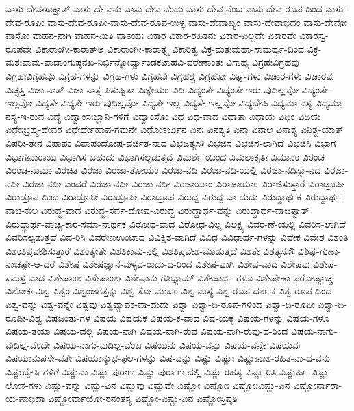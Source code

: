 {ವಾಸು-ದೇವಃಸಾಕ್ಷಾತ್
ವಾಸು-ದೇ-ವನು
ವಾಸು-ದೇವ-ನೆಂದು
ವಾಸು-ದೇವ-ನೆಂಬ
ವಾಸು-ದೇವ-ರೂಪ-ದಿಂದ
ವಾಸು-ದೇವ-ರೂಪೀ
ವಾಸು-ದೇವ-ರೂಪೀ-ವಾಸು-ದೇವ-ರೂಪ-ಉಳ್ಳ
ವಾಸು-ದೇವಾಖ್ಯಂ
ವಾಸು-ದೇವಾಭಿದಂ
ವಾಸು-ದೇವೋ
ವಾಸೋ
ವಾಹನ-ನಾಗಿ
ವಾಹನ-ಮಿತಿ
ವಾಽಯಃ
ವಿಕಾರ
ವಿಕಾರ-ರಹಿತನು
ವಿಕಾರ-ವಿಲ್ಲದೇ
ವಿಕಾರವೇ
ವಿಕಾರಸ್ವ-ರೂಪವೇ
ವಿಕಾರಾಂಗೀ-ಕಾರಾತ್ಅ
ವಿಕಾರಾಂಗೀ-ಕಾರಾತ್ನೃ
ವಿಕಾರಿತ್ವ
ವಿಕ್ರ-ಮತಃಮಹಾ-ಸಾಮರ್ಥ್ಯ-ದಿಂದ
ವಿಕ್ರ-ಮತಃವಾಮ-ಪಾದಾಂಗುಷ್ಠನಖ-ನಿರ್ಭಿನ್ನೋರ್ಧ್ವಾಂಡಕಟಾಹವಿ-ವರೇಣಾಂತಃ
ವಿಗಾಹ್ಯ
ವಿಗ್ರಹಃವಿಗ್ರಹವು
ವಿಗ್ರಹಃವಿಗ್ರಹವೂ
ವಿಗ್ರಹ-ಗಳನ್ನು
ವಿಗ್ರಹ-ಗಳು
ವಿಗ್ರಹವು
ವಿಗ್ರಹಶ್ಚ
ವಿಗ್ರಹೋ
ವಿಘ್ನ-ಗಳು
ವಿಚಾರ-ಗಳು
ವಿಚಾರವು
ವಿಚ್ಛತ್ತಿ
ವಿಜಾ-ನಾತ್
ವಿಜಾ-ನಾತ್ಸ-ಪಿತುಷ್ಟಿತಾ
ವಿಜ್ಞೇಯಂ
ವಿದಿ
ವಿದ್ಯಂತೇ
ವಿದ್ಯಂತೇ-ಇರು-ವುದಿಲ್ಲವೋ
ವಿದ್ಯಂತೇ-ಇಲ್ಲವೋ
ವಿದ್ಯತೇ
ವಿದ್ಯತೇ-ಇರು-ವುದಿಲ್ಲವೋ
ವಿದ್ಯತೇ-ಇಲ್ಲ
ವಿದ್ಯತೇ-ಇಲ್ಲವೋ
ವಿದ್ಯದೇಪಿ
ವಿದ್ಯಮಾ-ನಸ್ಯ
ವಿದ್ಯಮಾ-ನಸ್ಯ-ಇ-ರುವ
ವಿದ್ಯೆ
ವಿದ್ವಾಂಸಃಜ್ಞಾನಿ-ಗಳಿಗೆ
ವಿದ್ವಾಂಸೋ
ವಿಧ
ವಿಧ-ವಾದ
ವಿಧಾತಾ
ವಿಧಾಯ
ವಿಧಿಂ
ವಿಧಿಯ
ವಿಧೇಃಬ್ರಹ್ಮ-ದೇವರ
ವಿಧೇರ್ದೇಹಾಪ-ಗಮನೇ
ವಿಧೋಽರ್ಜುನ
ವಿನಃ
ವಿನಶ್ಯತಿ
ವಿನಾ
ವಿನಾಆ
ವಿನಾಶ್ಯ
ವಿನಿಶ್ಚ-ಯಾತ್
ವಿಪರೀ-ತೇನ
ವಿಪಾಪಂ
ವಿಪಾಪಂದೋಷ-ವರ್ಜಿತ-ನಾದ
ವಿಭಜತ್ಯಸೌ
ವಿಭಜಿಸ
ವಿಭಜಿಸ-ಲಾಗಿದೆ
ವಿಭಜಿಸಿ
ವಿಭಾಗ
ವಿಭಾಗಃನಾರಾಯ
ವಿಭಾಗಿಸ-ಬಹುದು
ವಿಭಾಗಿಸಲ್ಪಡುತ್ತದೆ
ವಿಮರ್ಶೆ-ಯಿಂದ
ವಿಮಲಾಕೃತಿಃ
ವಿಮಾನಂ
ವಿರಂಚ
ವಿರಂಚ-ನಾಮಾ
ವಿರಚಿತ
ವಿರಜಾ
ವಿರಜಾ-ತೋಯಂ
ವಿರಜಾ-ನದಿ
ವಿರಜಾ-ನದಿ-ಯಲ್ಲಿ
ವಿರಜಾ-ನದಿಸ್ನಾ-ನದ
ವಿರಜಾ-ನದೀ
ವಿರಜಾ-ನದೀ-ಎಂದರೆ
ವಿರಜಾ-ನದೀ-ವಿರಜಾ-ನದೀ
ವಿರಜಾಯಾಂ
ವಿರಾಜಾಯಾಂ
ವಿರಾಜಿಸುತ್ತಾರೆ
ವಿರಾಟ್ರೂಪೀ
ವಿರಾಡ್ರೂಪ-ದಿಂದ
ವಿರಾಡ್ರೂಪೀ
ವಿರಾಡ್ರೂಪೀ-ವಿರಾಟ್ರೂಪ
ವಿರುದ್ದ
ವಿರುದ್ದ-ವಾ-ದುದು
ವಿರುದ್ದಾರ್ಥಕ
ವಿರುದ್ದಾರ್ಥ-ವಾಚ-ಕಃಅ
ವಿರುದ್ಧ-ವಾದ
ವಿರುದ್ಧ-ಸರ್ವ-ದೋಷ-ವಿರುದ್ಧ
ವಿರುದ್ಧಾರ್ಥ-ವನ್ನು
ವಿರುದ್ಧಾರ್ಥ-ವಾಚಿತ್ವಾತ್
ವಿರುದ್ಧಾರ್ಥ-ವಾಚ್ಯ-ಕಾರ-ಸಮಾ-ನಾರ್ಥಕ
ವಿರೋಧ-ವಾದ
ವಿರೋಧ-ವಿಲ್ಲ
ವಿಲಕ್ಷ್ಯ
ವಿವರ-ಣೆ-ಯಲ್ಲಿ
ವಿವರಿಸ-ಲಾಗಿದೆ
ವಿವರಿಸಲ್ಪಡುತ್ತದೆ
ವಿವ-ರಿಸಿ
ವಿವರೇಣಉಂಟಾದ
ವಿವಿಕ್ಷಿತ-ವಾಗಿದೆ
ವಿವಿಧ
ವಿವಿಧಾರ್ಥ-ಗಳನ್ನು
ವಿವೇಕ
ವಿವೇಶ
ವಿಶಂತಿ
ವಿಶಂತಿಪ್ರವೇಶಿಸುತ್ತಾರೆ
ವಿಶಂತ್ಯೇತೇ
ವಿಶತಿಕಾಮ-ನಲ್ಲಿ
ವಿಶತಿಪ್ರವೇಶ-ಮಾಡುತ್ತದೆ
ವಿಶತೇ
ವಿಶತ್ಯಸಸೌ
ವಿಶಿಷ್ಟ-ಗುಣಾ-ನಾಚಷ್ಟೇ-ಆ-ದರೆ
ವಿಶೇಷ
ವಿಶೇಷಜ್ಞಾನ-ವುಳ್ಳವ-ರಾದು-ದ-ರಿಂದ
ವಿಶೇಷ-ವಾಗಿ
ವಿಶೇಷ-ವಾದ
ವಿಶೇಷವು
ವಿಶೇಷ-ಸಮಸ್ತ-ವಾದ
ವಿಶೇಷಾಂಶ
ವಿಶೇಷಾಂಶಃ
ವಿಶೇಷಾನು-ಗತಿಭ್ಯಾಮ್
ವಿಶೇಷಾರ್ಥ-ಗಳೂ
ವಿಶೇಷೇಣಾ-ಪರೋಷ್ಯಾಚ್ಚ
ವಿಶೋಕಃ
ವಿಶ್ವ
ವಿಶ್ವಂ
ವಿಶ್ವಂಜಗತ್ತನ್ನು
ವಿಶ್ವ-ತೋ-ಮುಖಂ
ವಿಶ್ವ-ಮಸ್ಯ
ವಿಶ್ವ-ರೂಪ-ದರ್ಶನ
ವಿಶ್ವ-ರೂಪ-ದಿಂದ
ವಿಶ್ವ-ವನ್ನು
ವಿಶ್ವ-ವನ್ನೇ
ವಿಶ್ವವು
ವಿಶ್ವವ್ಯಾಪಕ-ವಾ-ದುದು
ವಿಶ್ವಾ
ವಿಶ್ವಾ-ದಿ-ರೂಪ-ಗಳಿಂದ
ವಿಶ್ವಾ-ದಿ-ರೂಪೀ
ವಿಶ್ವಾ-ದಿ-ರೂಪೀ-ವಿಶ್ವ
ವಿಷಜಂತು-ಗಳ
ವಿಷಯ
ವಿಷಯಕ
ವಿಷಯ-ಕ-ವಾದ
ವಿಷ-ಯಕ್ಕೆ
ವಿಷಯ-ಗಳನ್ನು
ವಿಷಯ-ಗಳೂ
ವಿಷಯ-ತಯಾ
ವಿಷಯ-ದಲ್ಲಿ
ವಿಷಯ-ನಾಗಿ
ವಿಷಯ-ನಾಗಿ-ರುವ
ವಿಷಯ-ನಾಗಿ-ರುವು-ದ-ರಿಂದ
ವಿಷಯ-ನಾಗು-ವುದಿಲ್ಲ-ವೆಂದೇ
ವಿಷಯ-ನಾಗು-ವುದಿಲ್ಲ-ವೆಂಬ
ವಿಷಯನು
ವಿಷಯ-ವನ್ನು
ವಿಷಯ-ವನ್ನೇ
ವಿಷಯವು
ವಿಷಯಾನುಪಸೇ-ವತೇ
ವಿಷಯಾನ್ಶುಭ-ಫಲ-ಗಳನ್ನು
ವಿಷ-ವನ್ನು
ವಿಷ್ಣು
ವಿಷ್ಣುಃ
ವಿಷ್ಣುಃನಾಶ-ರಹಿತ-ನಾ-ದ-ವನು
ವಿಷ್ಣುದ್ವೇಷಿ-ಗಳಿಗೆ
ವಿಷ್ಣುನಾ
ವಿಷ್ಣು-ಪುರಾಣ
ವಿಷ್ಣು-ಪುರಾ-ಣ-ದಲ್ಲಿ
ವಿಷ್ಣು-ರಹಸ್ಯ
ವಿಷ್ಣು-ರಿತಿ
ವಿಷ್ಣುರ್ಹಿ
ವಿಷ್ಣು-ಲೋಕ-ಗಳು
ವಿಷ್ಣು-ವನ್ನು
ವಿಷ್ಣು-ವಿನ
ವಿಷ್ಣುವು
ವಿಷ್ಣುವೇ
ವಿಷ್ಣೋ
ವಿಷ್ಣೋಃ
ವಿಷ್ಣೋಃವಿಷ್ಣು-ವಿನ
ವಿಷ್ಣೋರ್ನಾರಾ-ಯ-ಣಾಭಿದಾ
ವಿಷ್ಣೋರ್ವಾಯೋ-ರನಂತಸ್ಯ
ವಿಷ್ಣೋ-ವಿಷ್ಣು-ವಿನ
ವಿಷ್ಣೋಸ್ತಿಷ್ಠತಿ
}
